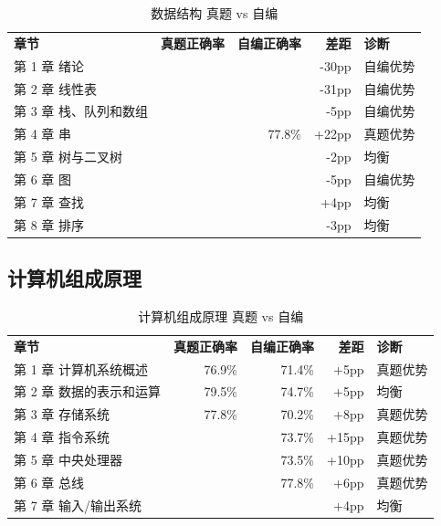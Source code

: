 \documentclass[12pt,a4paper]{ctexart}
\begin{document}
\begin{table}[H]
\footnotesize
\centering
\begin{tabular}{lrrrl}
\hline
\rowcolor{headerbg}\textcolor{headerfg}{\textbf{章节}} & \textcolor{headerfg}{\textbf{真题正确率}} & \textcolor{headerfg}{\textbf{自编正确率}} & \textcolor{headerfg}{\textbf{差距}} & \textcolor{headerfg}{\textbf{诊断}} \\
第 1 章  绪论 & \cellcolor{redrate}{57.1\%} & \cellcolor{yellowrate}{87.5\%} & -30pp & 自编优势 \\
第 2 章  线性表 & \cellcolor{redrate}{50.0\%} & \cellcolor{yellowrate}{80.9\%} & -31pp & 自编优势 \\
第 3 章  栈、队列和数组 & \cellcolor{yellowrate}{80.8\%} & \cellcolor{yellowrate}{86.2\%} & -5pp & 自编优势 \\
第 4 章  串 & \cellcolor{greenrate}{100.0\%} & 77.8\% & +22pp & 真题优势 \\
第 5 章  树与二叉树 & \cellcolor{yellowrate}{86.5\%} & \cellcolor{yellowrate}{88.9\%} & -2pp & 均衡 \\
第 6 章  图 & \cellcolor{yellowrate}{83.9\%} & \cellcolor{yellowrate}{88.9\%} & -5pp & 自编优势 \\
第 7 章  查找 & \cellcolor{yellowrate}{89.5\%} & \cellcolor{yellowrate}{85.9\%} & +4pp & 均衡 \\
第 8 章  排序 & \cellcolor{yellowrate}{82.6\%} & \cellcolor{yellowrate}{85.2\%} & -3pp & 均衡 \\
\hline
\end{tabular}
\caption{数据结构 真题 vs 自编}
\end{table}

\subsection{计算机组成原理}

\begin{table}[H]
\footnotesize
\centering
\begin{tabular}{lrrrl}
\hline
\rowcolor{headerbg}\textcolor{headerfg}{\textbf{章节}} & \textcolor{headerfg}{\textbf{真题正确率}} & \textcolor{headerfg}{\textbf{自编正确率}} & \textcolor{headerfg}{\textbf{差距}} & \textcolor{headerfg}{\textbf{诊断}} \\
第 1 章  计算机系统概述 & 76.9\% & 71.4\% & +5pp & 真题优势 \\
第 2 章  数据的表示和运算 & 79.5\% & 74.7\% & +5pp & 均衡 \\
第 3 章  存储系统 & 77.8\% & 70.2\% & +8pp & 真题优势 \\
第 4 章  指令系统 & \cellcolor{yellowrate}{88.2\%} & 73.7\% & +15pp & 真题优势 \\
第 5 章  中央处理器 & \cellcolor{yellowrate}{83.3\%} & 73.5\% & +10pp & 真题优势 \\
第 6 章  总线 & \cellcolor{yellowrate}{83.3\%} & 77.8\% & +6pp & 真题优势 \\
第 7 章  输入/输出系统 & \cellcolor{redrate}{64.3\%} & \cellcolor{redrate}{60.4\%} & +4pp & 均衡 \\
\hline
\end{tabular}
\caption{计算机组成原理 真题 vs 自编}
\end{table}
\end{document}
